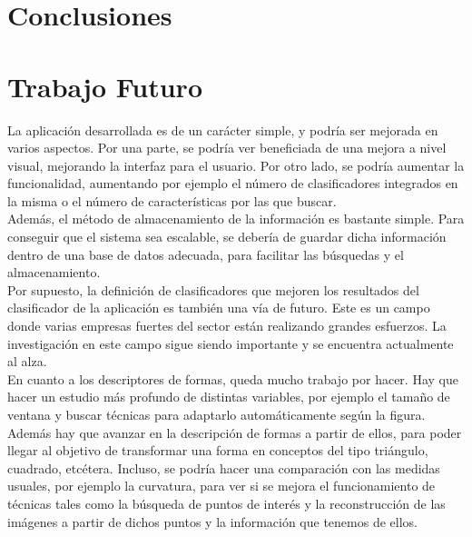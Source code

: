 \section{Conclusiones}

\section{Trabajo Futuro}

La aplicación desarrollada es de un carácter simple, y podría ser mejorada en varios aspectos. Por una parte, se podría ver beneficiada de una mejora a nivel visual, mejorando la interfaz para el usuario. Por otro lado, se podría aumentar la funcionalidad, aumentando por ejemplo el número de clasificadores integrados en la misma o el número de características por las que buscar.\\

Además, el método de almacenamiento de la información es bastante simple. Para conseguir que el sistema sea escalable, se debería de guardar dicha información dentro de una base de datos adecuada, para facilitar las búsquedas y el almacenamiento.\\

Por supuesto, la definición de clasificadores que mejoren los resultados del clasificador de la aplicación es también una vía de futuro. Este es un campo donde varias empresas fuertes del sector están realizando grandes esfuerzos. La investigación en este campo sigue siendo importante y se encuentra actualmente al alza.\\

En cuanto a los descriptores de formas, queda mucho trabajo por hacer. Hay que hacer un estudio más profundo de distintas variables, por ejemplo el tamaño de ventana y buscar técnicas para adaptarlo automáticamente según la figura. Además hay que avanzar en la descripción de formas a partir de ellos, para poder llegar al objetivo de transformar una forma en conceptos del tipo triángulo, cuadrado, etcétera. Incluso, se podría hacer una comparación con las medidas usuales, por ejemplo la curvatura, para ver si se mejora el funcionamiento de técnicas tales como la búsqueda de puntos de interés y la reconstrucción de las imágenes a partir de dichos puntos y la información que tenemos de ellos.\\

